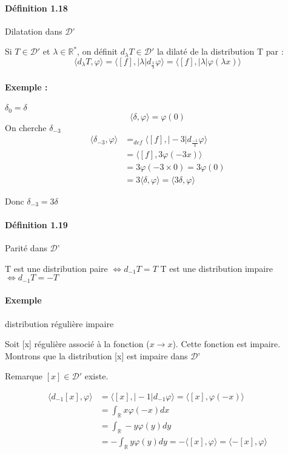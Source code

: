 \documentclass[12pt,a4paper]{report}
\newcommand{\ens}[1]{\mathbb{#1}}
\newcommand{\D}{\ensuremath{\mathcal{D}}}
\begin{document}
\paragraph{Définition 1.18} Dilatation dans \D'

Si \(T \in \D'\) et \(\lambda \in \ens{R^*}\), on définit \(d_\lambda T \in \D'\) la dilaté de la distribution T par :
\[
	\langle d_\lambda T, \varphi \rangle = \langle [f], \vert \lambda \vert d_{\frac{1}{\lambda}} \varphi \rangle = \langle [f], \vert \lambda \vert \varphi (\lambda x) \rangle 
\]

\paragraph{Exemple : } \(\delta_0 = \delta\)
\[
	\langle \delta, \varphi \rangle = \varphi(0)
\]
On cherche \(\delta_{-3}\)
\begin{align*}
	\langle \delta_{-3}, \varphi \rangle &=_{def} \langle [f], \vert -3 \vert d_{\frac{-1}{3}} \varphi \rangle\\
	&= \langle [f], 3 \varphi(-3x) \rangle\\
	&= 3 \varphi (-3 \times 0) = 3 \varphi (0)\\
	&= 3 \langle \delta, \varphi \rangle = \langle 3\delta, \varphi \rangle 
\end{align*}

Donc \(\delta_{-3} = 3\delta\) 

\paragraph{Définition 1.19} Parité dans \D'

T est une distribution paire \(\Leftrightarrow d_{-1} T = T\)
T est une distribution impaire \(\Leftrightarrow d_{-1} T = -T\)

\paragraph{Exemple} distribution régulière impaire

Soit [x] régulière associé à la fonction (\(x \rightarrow x\)). Cette fonction est impaire. Montrons que la distribution [x] est impaire dans \D'

Remarque \([x] \in \D'\) existe.

\begin{align*}
	\langle d_{-1} [x], \varphi \rangle &= \langle [x],\vert -1 \vert d_{-1} \varphi \rangle = \langle [x], \varphi(-x) \rangle\\
	&= \int_{\ens{R}} x \varphi(-x) dx\\
	&= \int_{\ens{R}} -y \varphi(y) dy\\
	&= - \int_{\ens{R}} y \varphi(y) dy = - \langle [x], \varphi \rangle = \langle -[x], \varphi \rangle\\
\end{align*}
\end{document}
